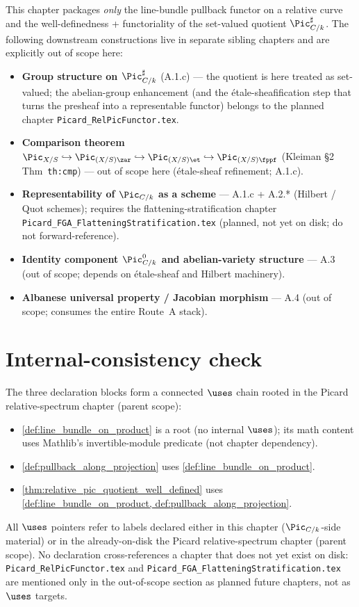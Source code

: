 This chapter packages \emph{only} the line-bundle pullback functor on a
relative curve and the well-definedness + functoriality of the set-valued
quotient \(\Pic^\sharp_{C/k}\). The following downstream constructions live in
separate sibling chapters and are explicitly out of scope here:
\begin{itemize}
  \item \textbf{Group structure on \(\Pic^\sharp_{C/k}\)} (A.1.c) --- the
    quotient is here treated as set-valued; the abelian-group enhancement
    (and the \'etale-sheafification step that turns the presheaf into a
    representable functor) belongs to the planned chapter
    \texttt{Picard\_RelPicFunctor.tex}.
  \item \textbf{Comparison theorem $\Pic_{X/S} \hookrightarrow \Pic_{(X/S)\zar}
    \hookrightarrow \Pic_{(X/S)\et} \hookrightarrow \Pic_{(X/S)\fppf}$}
    (Kleiman §2 Thm~\texttt{th:cmp}) --- out of scope here (\'etale-sheaf
    refinement; A.1.c).
  \item \textbf{Representability of \(\Pic_{C/k}\) as a scheme} --- A.1.c +
    A.2.* (Hilbert / Quot schemes); requires the flattening-stratification
    chapter \texttt{Picard\_FGA\_FlatteningStratification.tex} (planned, not
    yet on disk; do not forward-reference).
  \item \textbf{Identity component \(\Pic^0_{C/k}\) and abelian-variety
    structure} --- A.3 (out of scope; depends on \'etale-sheaf and Hilbert
    machinery).
  \item \textbf{Albanese universal property / Jacobian morphism} --- A.4 (out
    of scope; consumes the entire Route~A stack).
\end{itemize}

\section{Internal-consistency check}
\label{sec:lbp_consistency_check}

The three declaration blocks form a connected \(\uses\) chain rooted in
the Picard relative-spectrum chapter (parent scope):
\begin{itemize}
  \item \cref{def:line_bundle_on_product} is a root (no internal \(\uses\));
    its math content uses Mathlib's invertible-module predicate (not chapter
    dependency).
  \item \cref{def:pullback_along_projection} uses
    \cref{def:line_bundle_on_product}.
  \item \cref{thm:relative_pic_quotient_well_defined} uses
    \cref{def:line_bundle_on_product, def:pullback_along_projection}.
\end{itemize}
All \(\uses\) pointers refer to labels declared either in this chapter
(\(\Pic_{C/k}\)-side material) or in the already-on-disk
the Picard relative-spectrum chapter (parent scope). No declaration cross-references a chapter
that does not yet exist on disk: \texttt{Picard\_RelPicFunctor.tex} and
\texttt{Picard\_FGA\_FlatteningStratification.tex} are mentioned only in the
out-of-scope section as planned future chapters, not as \(\uses\) targets.
